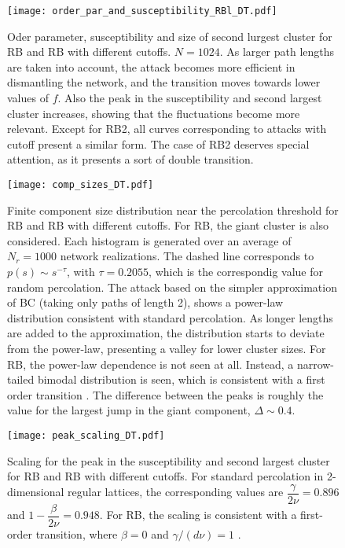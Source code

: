 \documentclass{article}
\begin{document}
\begin{figure}
\centering
\texttt{[image: order\_par\_and\_susceptibility\_RBl\_DT.pdf]}
\caption{Oder parameter, susceptibility and size of second lurgest cluster for RB and RB with different cutoffs. $N = 1024$. As larger path lengths are taken into account, the attack becomes more efficient in dismantling the network, and the transition moves towards lower values of $f$. Also the peak in the susceptibility and second largest cluster increases, showing that the fluctuations become more relevant. Except for RB2, all curves corresponding to attacks with cutoff present a similar form. The case of RB2 deserves special attention, as it presents a sort of double transition.}
\end{figure}



\begin{figure}
\centering
\texttt{[image: comp\_sizes\_DT.pdf]}
\caption{Finite component size distribution near the percolation threshold for RB and RB with different cutoffs. For RB, the giant cluster is also considered. Each histogram is generated over an average of $N_r = 1000$ network realizations. The dashed line corresponds to $p(s) \sim s^{-\tau}$, with $\tau = 0.2055$, which is the correspondig value for random percolation. The attack based on the simpler approximation of BC (taking only paths of length 2), shows a power-law distribution consistent with standard percolation. As longer lengths are added to the approximation, the distribution starts to deviate from the power-law, presenting a valley for lower cluster sizes. For RB, the power-law dependence is not seen at all. Instead, a narrow-tailed bimodal distribution is seen, which is consistent with a first order transition \cite{Araujo2010,Binder1992} . The difference between the peaks is roughly the value for the largest jump in the giant component, $\Delta\sim 0.4$. }
\end{figure}

\begin{figure}
\centering
\texttt{[image: peak\_scaling\_DT.pdf]}
\caption{Scaling for the peak in the susceptibility and second largest cluster for RB and RB with different cutoffs. For standard percolation in 2-dimensional regular lattices, the corresponding values are $\dfrac{\gamma}{2\nu} = 0.896$ and $1-\dfrac{\beta}{2\nu} = 0.948$. For RB, the scaling is consistent with a first-order transition, where $\beta = 0$ and $\gamma/(d\nu) = 1$ \cite{Binder1981,Binder1984,Cho2009}. }
\end{figure}
\end{document}
